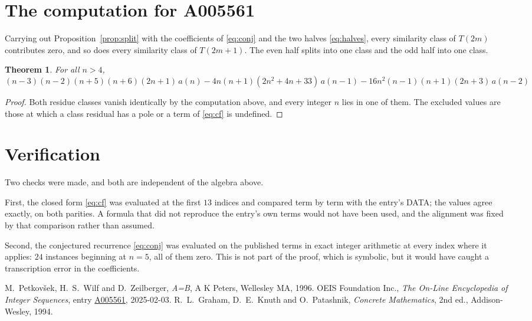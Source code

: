 \documentclass[11pt,a4paper]{article}
\theoremstyle{plain}
\newtheorem{theorem}{Theorem}
\theoremstyle{definition}
\begin{document}
\section{The computation for A005561}

Carrying out Proposition~\ref{prop:split} with the coefficients of \eqref{eq:conj} and the
two halves \eqref{eq:halves}, every similarity class of $T(2m)$ contributes zero, and so
does every similarity class of $T(2m+1)$. The even half splits into one class
and the odd half into one class.

\begin{theorem}
For all $n> 4$,
\[
\left(n - 3\right) \left(n - 2\right) \left(n + 5\right) \left(n + 6\right) \left(2 n + 1\right)\,a(n) -  4 n \left(n + 1\right) \left(2 n^{2} + 4 n + 33\right)\,a(n-1) -  16 n^{2} \left(n - 1\right) \left(n + 1\right) \left(2 n + 3\right)\,a(n-2)
\]
\end{theorem}

\begin{proof}
Both residue classes vanish identically by the computation above, and every integer $n$
lies in one of them. The excluded values are those at which a class residual has a pole or
a term of \eqref{eq:cf} is undefined.
\end{proof}

\section{Verification}

Two checks were made, and both are independent of the algebra above.

First, the closed form \eqref{eq:cf} was evaluated at the first $13$ indices and
compared term by term with the entry's DATA; the values agree exactly, on both parities. A
formula that did not reproduce the entry's own terms would not have been used, and the
alignment was fixed by that comparison rather than assumed.

Second, the conjectured recurrence \eqref{eq:conj} was evaluated on the published terms in
exact integer arithmetic at every index where it applies: $24$ instances beginning at
$n=5$, all of them zero. This is not part of the proof, which is symbolic, but it
would have caught a transcription error in the coefficients.

\begin{thebibliography}{9}
 M.~Petkov\v{s}ek, H.~S.~Wilf and D.~Zeilberger, \emph{A=B}, A K Peters,
Wellesley MA, 1996.
 OEIS Foundation Inc., \emph{The On-Line Encyclopedia of Integer Sequences},
entry \href{https://oeis.org/A005561}{A005561}, 2025-02-03.
 R.~L.~Graham, D.~E.~Knuth and O.~Patashnik, \emph{Concrete Mathematics},
2nd ed., Addison-Wesley, 1994.
\end{thebibliography}
\end{document}
